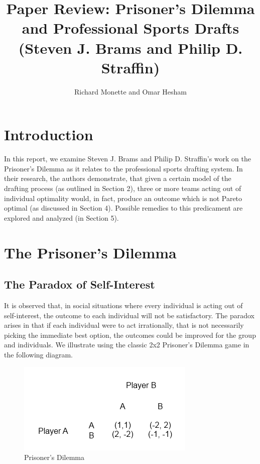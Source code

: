 \documentclass{article}
\begin{document}
\title{Paper Review: Prisoner's Dilemma and Professional Sports Drafts (Steven J. Brams and Philip D. Straffin)}
\author{Richard Monette and Omar Hesham}

\maketitle

\pagebreak[4]

\section{Introduction}

In this report, we examine Steven J. Brams and Philip D. Straffin's work \cite{straffin79} on the Prisoner's Dilemma as it relates to the professional sports drafting system. In their research, the authors demonstrate, that given a certain model of the drafting process (as outlined in Section 2), three or more teams acting out of individual optimality would, in fact, produce an outcome which is not Pareto optimal (as discussed in Section 4). Possible remedies to this predicament are explored and analyzed (in Section 5).

\section{The Prisoner's Dilemma}

\subsection{The Paradox of Self-Interest}

It is observed that, in social situations where every individual is acting out of self-interest, the outcome to each individual will not be satisfactory. The paradox arises in that if each individual were to act irrationally, that is not necessarily picking the immediate best option, the outcomes could be improved for the group and individuals. We illustrate using the classic 2x2 Prisoner's Dilemma game\cite{tucker50} in the following diagram.

\begin{figure}[H]
	\centering
	\includegraphics[scale=1.0]{PrisonersDilemma}
	\caption{Prisoner's Dilemma}
\end{figure}
\end{document}
